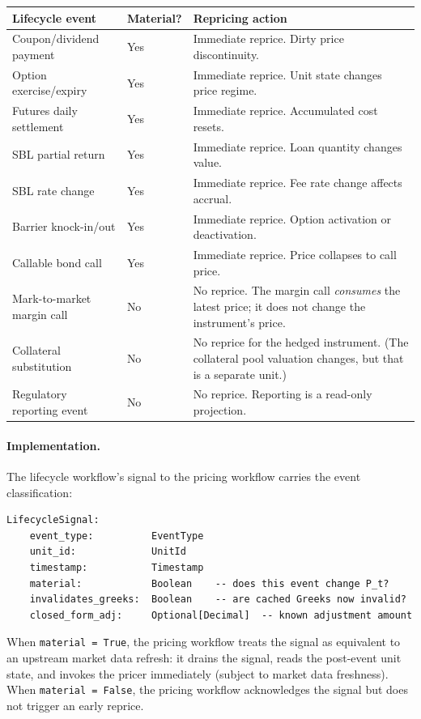 \documentclass[11pt,a4paper]{article}
\begin{document}
\begin{center}
\small
\begin{tabular}{l l l}
\toprule
\textbf{Lifecycle event} & \textbf{Material?} & \textbf{Repricing action} \\
\midrule
Coupon/dividend payment & Yes & Immediate reprice.  Dirty price discontinuity. \\
Option exercise/expiry & Yes & Immediate reprice.  Unit state changes price regime. \\
Futures daily settlement & Yes & Immediate reprice.  Accumulated cost resets. \\
SBL partial return & Yes & Immediate reprice.  Loan quantity changes value. \\
SBL rate change & Yes & Immediate reprice.  Fee rate change affects accrual. \\
Barrier knock-in/out & Yes & Immediate reprice.  Option activation or deactivation. \\
Callable bond call & Yes & Immediate reprice.  Price collapses to call price. \\
\midrule
Mark-to-market margin call & No & No reprice.  The margin call \emph{consumes} the latest price; it does not change the instrument's price. \\
Collateral substitution & No & No reprice for the hedged instrument.  (The collateral pool valuation changes, but that is a separate unit.) \\
Regulatory reporting event & No & No reprice.  Reporting is a read-only projection. \\
\bottomrule
\end{tabular}
\end{center}

\paragraph{Implementation.}  The lifecycle workflow's signal to the pricing workflow carries the event classification:

\begin{lstlisting}
LifecycleSignal:
    event_type:          EventType
    unit_id:             UnitId
    timestamp:           Timestamp
    material:            Boolean    -- does this event change P_t?
    invalidates_greeks:  Boolean    -- are cached Greeks now invalid?
    closed_form_adj:     Optional[Decimal]  -- known adjustment amount
\end{lstlisting}

\noindent When \texttt{material = True}, the pricing workflow treats the signal as equivalent to an upstream market data refresh: it drains the signal, reads the post-event unit state, and invokes the pricer immediately (subject to market data freshness).  When \texttt{material = False}, the pricing workflow acknowledges the signal but does not trigger an early reprice.
\end{document}
